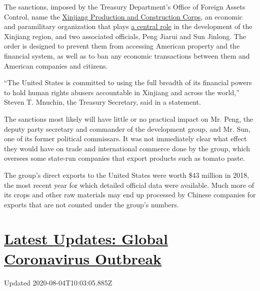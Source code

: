 The sanctions, imposed by the Treasury Department's Office of Foreign
Assets Control, name the
\href{https://www.nytimes.com/2009/08/07/world/asia/07xinjiang.html}{Xinjiang
Production and Construction Corps}, an economic and paramilitary
organization that plays
\href{https://www.andrewerickson.com/2019/11/the-xinjiang-production-construction-corps-key-policy-tool-from-mao-to-xi/}{a
central role} in the development of the Xinjiang region, and two
associated officials, Peng Jiarui and Sun Jinlong. The order is designed
to prevent them from accessing American property and the financial
system, as well as to ban any economic transactions between them and
American companies and citizens.

``The United States is committed to using the full breadth of its
financial powers to hold human rights abusers accountable in Xinjiang
and across the world,'' Steven T. Mnuchin, the Treasury Secretary, said
in a statement.

The sanctions most likely will have little or no practical impact on Mr.
Peng, the deputy party secretary and commander of the development group,
and Mr. Sun, one of its former political commissars. It was not
immediately clear what effect they would have on trade and international
commerce done by the group, which oversees some state-run companies that
export products such as tomato paste.

The group's direct exports to the United States were worth \$43 million
in 2018, the most recent year for which detailed official data were
available. Much more of its crops and other raw materials may end up
processed by Chinese companies for exports that are not counted under
the group's numbers.

\hypertarget{latest-updates-global-coronavirus-outbreak}{%
\section{\texorpdfstring{\href{https://www.nytimes.com/2020/08/04/world/coronavirus-covid-19.html?action=click\&pgtype=Article\&state=default\&region=MAIN_CONTENT_1\&context=storylines_live_updates}{Latest
Updates: Global Coronavirus
Outbreak}}{Latest Updates: Global Coronavirus Outbreak}}\label{latest-updates-global-coronavirus-outbreak}}

Updated 2020-08-04T10:03:05.885Z

